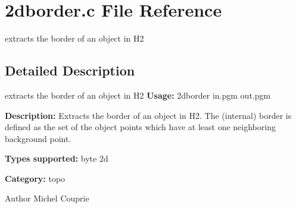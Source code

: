 \section{2dborder.c File Reference}
\label{2dborder_8c}


extracts the border of an object in H2  




\subsection{Detailed Description}
extracts the border of an object in H2 {\bfseries Usage:} 2dborder in.pgm out.pgm

{\bfseries Description:} Extracts the border of an object in H2. The (internal) border is defined as the set of the object points which have at least one neighboring background point.

{\bfseries Types supported:} byte 2d

{\bfseries Category:} topo

\begin{DoxyAuthor}{Author}
Michel Couprie 
\end{DoxyAuthor}
